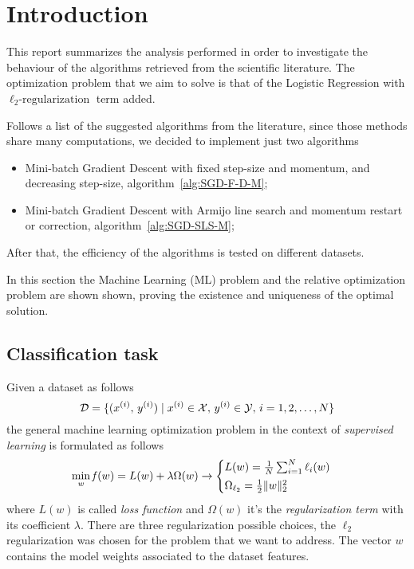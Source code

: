 \section{Introduction}\label{sc:intro}


This report summarizes the analysis performed in order to investigate the behaviour of the algorithms retrieved from the scientific literature. The optimization problem that we aim to solve is that of the Logistic Regression with $\ell_2\text{-regularization}$ term added.

Follows a list of the suggested algorithms from the literature, since those methods share many computations, we decided to implement just two algorithms
\begin{itemize}
\item Mini-batch Gradient Descent with fixed step-size and momentum, and decreasing step-size, algorithm~\vref{alg:SGD-F-D-M};
\item Mini-batch Gradient Descent with Armijo line search and momentum restart or correction, algorithm~\vref{alg:SGD-SLS-M};
\end{itemize}

After that, the efficiency of the algorithms is tested on different datasets.

In this section the Machine Learning (ML) problem and the relative optimization problem are shown shown, proving the existence and uniqueness of the optimal solution.

\subsection{Classification task}

Given a dataset as follows
\[
\mathcal{D}=\{(x^{(i)},\,y^{(i)})\mid x^{(i)}\in\mathcal{X},\,y^{(i)}\in\mathcal{Y},\,i=1,2,\dots,N\}
\]
the general machine learning optimization problem in the context of \emph{supervised learning} is formulated as follows
\[
\min_{w}\operatorname*{\mathit{f}}(w)=L(w)+\lambda\Omega(w)\rightarrow
\begin{cases}
L(w)=\frac{1}{N}\sum_{i=1}^N\ell_i(w) \\[0.5ex]
\Omega_{\ell_2}=\frac{1}{2}\lVert w\rVert_2^2
\end{cases}
\]
where $L(w)$ is called \emph{loss function} and $\Omega(w)$ it's the \emph{regularization term} with its coefficient $\lambda$. There are three regularization possible choices, the $\ell_2$ regularization was chosen for the problem that we want to address. The vector $w$ contains the model weights associated to the dataset features.

